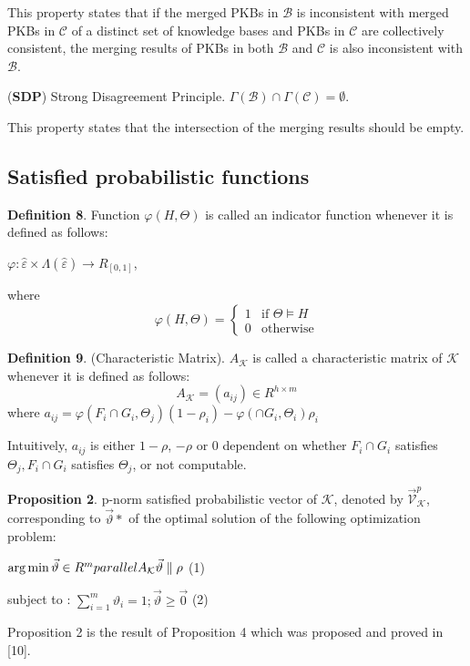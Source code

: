 \documentclass[]{iosart2c}
\begin{document}
This property states that if the merged PKBs in $\mathcal{B}$ is inconsistent with merged PKBs in $\mathcal{C}$ of a distinct set of knowledge bases and PKBs in $\mathcal{C}$ are collectively consistent, the merging results of PKBs in both $\mathcal{B}$ and $\mathcal{C}$ is also inconsistent with $\mathcal{B}$. 

(\textbf{SDP}) Strong Disagreement Principle. $\Gamma(\mathcal{B}) \cap \Gamma(\mathcal{C}) = \emptyset$.

This property states that the intersection of the merging results should be empty.

\subsection{Satisfied probabilistic functions}

\textbf{Definition 8}. Function $\varphi(H,\Theta)$ is called an indicator function whenever it is defined as follows:

$\varphi : \hat{\varepsilon} \times \Lambda(\hat{\varepsilon}) \to R_{[0,1]}$,

where $$\varphi(H,\Theta) =
\begin{cases}
 1	&\text{if $\Theta \models H$} \\
 0	&\text{otherwise}
\end{cases}
$$

\textbf{Definition 9}. (Characteristic Matrix). $A_\mathcal{K}$ is called a characteristic matrix of $\mathcal{K}$ whenever it is defined as follows:
$$
A_\mathcal{K} = (a_{ij}) \in R^{h \times m}
$$
where
$a_{ij} = \varphi(F_i \cap G_i,\Theta_j)(1 - \rho_i) - \varphi(\cap G_i,\Theta_i)\rho_i$

Intuitively, $a_{ij}$ is either $1-\rho$, $-\rho$ or 0 dependent on whether $F_i \cap G_i$ satisfies $\Theta_j, F_i \cap G_i$ satisfies $\Theta_j$, or not computable. 

\textbf{Proposition 2}. p-norm satisfied probabilistic vector of $\mathcal{K}$, denoted by $\vec{\mathcal{V}}^p_\mathcal{K}$, corresponding to $\vec{\vartheta}*$ of the optimal solution of the following optimization problem:

$\arg \min\vec{\vartheta}\in R^m\\parallel A_\mathcal{K} \vec{\vartheta}\parallel\rho$ (1)

subject to : $\sum^m_{i=1}\vartheta_i = 1; \vec{\vartheta}\geq\vec{0}$ (2)

Proposition 2 is the result of Proposition 4 which was proposed and proved in [10]. 
\end{document}

